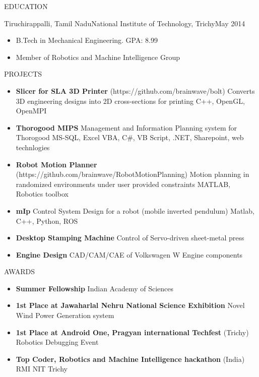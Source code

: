 \documentclass[]{mcdowellcv}
\begin{document}
\begin{cvsection}{EDUCATION}
	\begin{cvsubsection}{Tiruchirappalli, Tamil Nadu}{National Institute of Technology, Trichy}{May 2014}
		\begin{itemize}
			\item B.Tech in Mechanical Engineering. GPA: 8.99
	        \item Member of Robotics and Machine Intelligence Group
        \end{itemize}
	\end{cvsubsection}

\end{cvsection}

\begin{cvsection}{PROJECTS}
	\begin{cvsubsection}{}{}{}
		\begin{itemize}
			\setlength\itemsep{3pt}
			\item \textbf{Slicer for SLA 3D Printer} (https://github.com/brainwave/bolt)  Converts 3D engineering designs into 2D cross-sections for printing C++, OpenGL, OpenMPI
			\item \textbf{Thorogood MIPS}  Management and Information Planning system for Thorogood MS-SQL, Excel VBA, C\#, VB Script, .NET, Sharepoint, web technlogies
			\item \textbf{Robot Motion Planner} (https://github.com/brainwave/RobotMotionPlanning)  Motion planning in randomized environments under user provided constraints MATLAB, Robotics toolbox
			\item \textbf{mIp}  Control System Design for a robot (mobile inverted pendulum) Matlab, C++, Python, ROS
            \item \textbf{Desktop Stamping Machine} Control of Servo-driven sheet-metal press
            \item \textbf{Engine Design} CAD/CAM/CAE of Volkswagen W Engine components
		\end{itemize}
	\end{cvsubsection}
\end{cvsection}
\begin{cvsection}{AWARDS}
	\begin{cvsubsection}{}{}{}
		\begin{itemize}
			\setlength\itemsep{3pt}
            \item \textbf{Summer Fellowship} Indian Academy of Sciences
			\item \textbf{1st Place at Jawaharlal Nehru National Science Exhibition}  Novel Wind Power Generation system
			\item \textbf{1st Place at Android One, Pragyan international Techfest} (Trichy)  Robotics Debugging Event
			\item \textbf{Top Coder, Robotics and Machine Intelligence hackathon} (India)  RMI NIT Trichy
		\end{itemize}
	\end{cvsubsection}
\end{cvsection}
\end{document}
